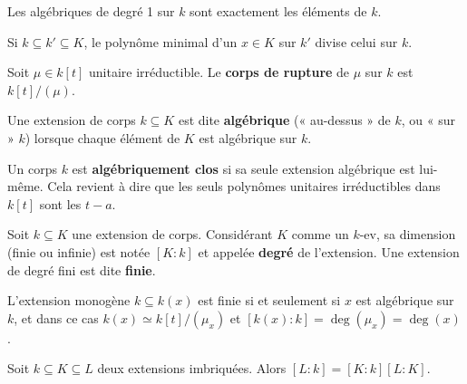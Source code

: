 	\begin{rem}
		Les algébriques de degré 1 sur $k$ sont exactement les éléments de $k$.
	\end{rem}
	
	\begin{rem}
		Si $k \subseteq k' \subseteq K$, le polynôme minimal d'un $x \in K$ sur $k'$ divise celui sur $k$.
	\end{rem}
	
	\begin{defn}
		Soit $\mu \in k[t]$ unitaire irréductible.
		Le \textbf{corps de rupture} de $\mu$ sur $k$ est $k[t]/(\mu)$.
	\end{defn}
	
	\begin{defn}
		Une extension de corps $k \subseteq K$ est dite \textbf{algébrique} (« au-dessus » de $k$, ou « sur » $k$) lorsque chaque élément de $K$ est algébrique sur $k$.
	\end{defn}
	
	\begin{defn}
		Un corps $k$ est \textbf{algébriquement clos} si sa seule extension algébrique est lui-même.
		Cela revient à dire que les seuls polynômes unitaires irréductibles dans  $k[t]$ sont les $t - a$.
	\end{defn}
	
	\begin{defn}
		Soit $k \subseteq K$ une extension de corps.
		Considérant $K$ comme un $k$-ev, sa dimension (finie ou infinie) est notée $[K:k]$ et appelée \textbf{degré} de l'extension.
		Une extension de degré fini est dite \textbf{finie}.
	\end{defn}
	
	\begin{pop}
		L'extension monogène $k \subseteq k(x)$ est finie si et seulement si $x$ est algébrique sur $k$, et dans ce cas $k(x) \simeq k[t]/(\mu_x)$ et $[k(x):k] = \deg(\mu_x) = \deg(x)$.
	\end{pop}
	
	\begin{pop}
		Soit $k \subseteq K \subseteq L$ deux extensions imbriquées.
		Alors $[L:k] = [K:k] [L:K]$.
	\end{pop}
	
